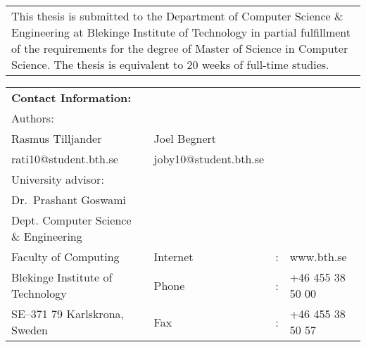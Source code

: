 \documentclass[a4paper,oneside]{bth}
\begin{document}
{\pagestyle{empty}
\changepage{5cm}{1cm}{-0.5cm}{-0.5cm}{}{-2cm}{}{}{}
\noindent%
\begin{tabular}{p{\textwidth}}
{\small This thesis is submitted to the Department of Computer Science \& Engineering at Blekinge
Institute of Technology in partial fulfillment of the requirements for the degree of Master
of Science in Computer Science. The thesis is equivalent to 20 weeks of
full-time studies.}
\end{tabular}

\par\vspace {12cm}

\noindent%
\begin{tabular}{p{}lcl}
\textbf{Contact Information:}\\
Authors:\\
Rasmus Tilljander               & Joel Begnert\\
rati10@student.bth.se   & joby10@student.bth.se\\
\par\vspace {5cm}
University advisor:\\
Dr.\ Prashant Goswami\\
Dept. Computer Science \& Engineering
\par\vspace {1cm}
\noindent%
 \\
Faculty of Computing & Internet & : & www.bth.se\\
Blekinge Institute of Technology & Phone	& : & +46 455 38 50 00 \\
SE--371 79 Karlskrona, Sweden & Fax & : & +46 455 38 50 57 \\
\end{tabular}
\clearpage
} %

\setcounter{page}{1}

\end{document}
